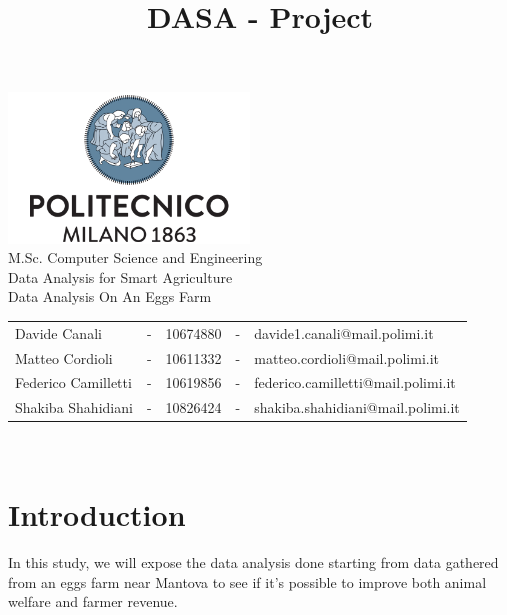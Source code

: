 \documentclass[11pt]{article}
\title{DASA - Project}
\begin{document}
\setlength{\parskip}{1em}

\begin{titlepage}
    \centering
    \vfill
    {
        \includegraphics[width =\linewidth, height = 4cm, keepaspectratio]{PolitecnicoLogo.png}
        \label{fig:PolitecnicoLogo}
        \large \\[2ex]M.Sc. Computer Science and Engineering\\
        \large Data Analysis for Smart Agriculture\\[12ex]
        \huge
        Data Analysis On An Eggs Farm\\[1.5ex]
        \large
        \vspace{10mm}

        \vspace{15mm}
        \normalsize

        \vspace{30mm}

        \begin{tabular}{lclcl}
            Davide Canali       & - & 10674880 & - & davide1.canali@mail.polimi.it      \\
            Matteo Cordioli     & - & 10611332 & - & matteo.cordioli@mail.polimi.it     \\
            Federico Camilletti & - & 10619856 & - & federico.camilletti@mail.polimi.it \\
            Shakiba Shahidiani  & - & 10826424 & - & shakiba.shahidiani@mail.polimi.it  \\
        \end{tabular}

        \vspace{30mm}

        \@date\\[2.5ex]
    }
\end{titlepage}

\makeatother
\tableofcontents
\newpage

\section{Introduction}
In this study, we will expose the data analysis done starting from data gathered from an eggs farm near Mantova to see if it's possible to improve both animal welfare and farmer revenue.
\end{document}
